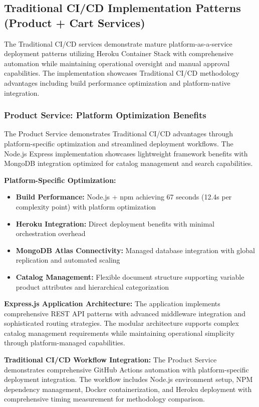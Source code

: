 \subsection{Traditional CI/CD Implementation Patterns (Product + Cart Services)}

The Traditional CI/CD services demonstrate mature platform-as-a-service deployment patterns utilizing Heroku Container Stack with comprehensive automation while maintaining operational oversight and manual approval capabilities. The implementation showcases Traditional CI/CD methodology advantages including build performance optimization and platform-native integration.

\subsubsection{Product Service: Platform Optimization Benefits}

The Product Service demonstrates Traditional CI/CD advantages through platform-specific optimization and streamlined deployment workflows. The Node.js Express implementation showcases lightweight framework benefits with MongoDB integration optimized for catalog management and search capabilities.

\textbf{Platform-Specific Optimization:}
\begin{itemize}
\item \textbf{Build Performance:} Node.js + npm achieving 67 seconds (12.4s per complexity point) with platform optimization
\item \textbf{Heroku Integration:} Direct deployment benefits with minimal orchestration overhead
\item \textbf{MongoDB Atlas Connectivity:} Managed database integration with global replication and automated scaling
\item \textbf{Catalog Management:} Flexible document structure supporting variable product attributes and hierarchical categorization
\end{itemize}

\textbf{Express.js Application Architecture:}
The application implements comprehensive REST API patterns with advanced middleware integration and sophisticated routing strategies. The modular architecture supports complex catalog management requirements while maintaining operational simplicity through platform-managed capabilities.

\textbf{Traditional CI/CD Workflow Integration:}
The Product Service demonstrates comprehensive GitHub Actions automation with platform-specific deployment integration. The workflow includes Node.js environment setup, NPM dependency management, Docker containerization, and Heroku deployment with comprehensive timing measurement for methodology comparison.

